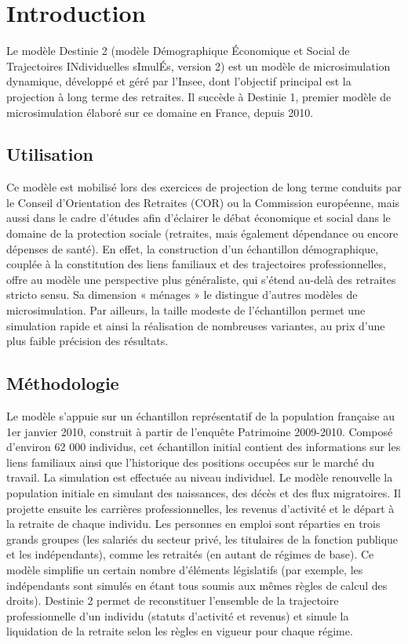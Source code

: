 \section{Introduction}
Le modèle Destinie 2 (modèle Démographique Économique et Social de Trajectoires INdividuelles sImulÉs, version 2) est un modèle de microsimulation dynamique, développé et géré par l’Insee, dont l’objectif principal est la projection à long terme des retraites. Il succède à Destinie 1, premier modèle de microsimulation élaboré sur ce domaine en France, depuis 2010.

\subsection*{Utilisation}
Ce modèle est mobilisé lors des exercices de projection de long terme conduits par le Conseil d’Orientation des Retraites (COR) ou la Commission européenne, mais aussi dans le cadre d'études afin d'éclairer le débat économique et social dans le domaine de la protection sociale (retraites, mais également dépendance ou encore dépenses de santé). En effet, la construction d’un échantillon démographique, couplée à la constitution des liens familiaux et des trajectoires professionnelles, offre au modèle une perspective plus généraliste, qui s’étend au-delà des retraites stricto sensu. Sa dimension « ménages » le distingue d’autres modèles de microsimulation. Par ailleurs, la taille modeste de l'échantillon permet une simulation rapide et ainsi la réalisation de nombreuses variantes, au prix d’une plus faible précision des résultats.


\subsection*{Méthodologie}
Le modèle s’appuie sur un échantillon représentatif de la population française au 1er janvier 2010, construit à partir de l’enquête Patrimoine 2009-2010. Composé d'environ 62 000 individus, cet échantillon initial contient des informations sur les liens familiaux ainsi que l'historique des positions occupées sur le marché du travail. 
La simulation est effectuée au niveau individuel. Le modèle renouvelle la population initiale en simulant des naissances, des décès et des flux migratoires. Il projette ensuite les carrières professionnelles, les revenus d’activité et le départ à la retraite de chaque individu. 
Les personnes en emploi sont réparties en trois grands groupes (les salariés du secteur privé, les titulaires de la fonction publique et les indépendants), comme les retraités (en autant de régimes de base). Ce modèle simplifie un certain nombre d’éléments législatifs (par exemple, les indépendants sont simulés en étant tous soumis aux mêmes règles de calcul des droits). Destinie 2 permet de reconstituer l’ensemble de la trajectoire professionnelle d’un individu (statuts d’activité et revenus) et simule la liquidation de la retraite selon les règles en vigueur pour chaque régime. 

